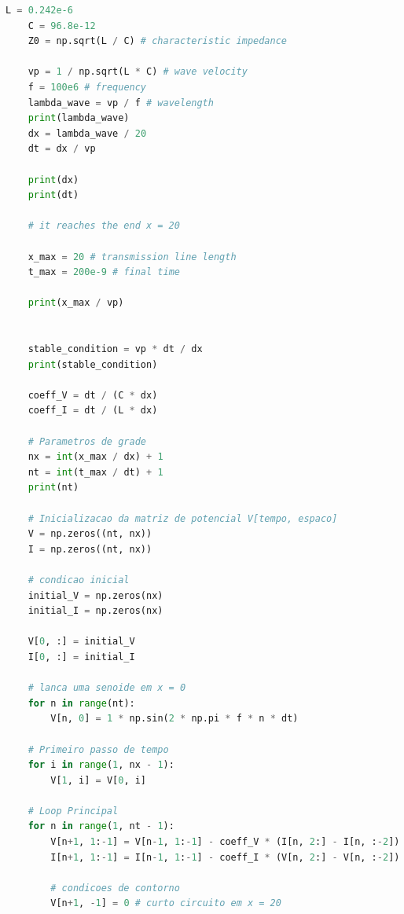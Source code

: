 \begin{anexosenv}
\begin{lstlisting}[language=Python, breaklines=true, basicstyle=\tiny]
    L = 0.242e-6
    C = 96.8e-12
    Z0 = np.sqrt(L / C) # characteristic impedance

    vp = 1 / np.sqrt(L * C) # wave velocity
    f = 100e6 # frequency
    lambda_wave = vp / f # wavelength
    print(lambda_wave)
    dx = lambda_wave / 20
    dt = dx / vp

    print(dx)
    print(dt)

    # it reaches the end x = 20 

    x_max = 20 # transmission line length
    t_max = 200e-9 # final time

    print(x_max / vp)


    stable_condition = vp * dt / dx
    print(stable_condition)

    coeff_V = dt / (C * dx)
    coeff_I = dt / (L * dx)

    # Parametros de grade
    nx = int(x_max / dx) + 1
    nt = int(t_max / dt) + 1
    print(nt)

    # Inicializacao da matriz de potencial V[tempo, espaco]
    V = np.zeros((nt, nx))
    I = np.zeros((nt, nx))

    # condicao inicial
    initial_V = np.zeros(nx)
    initial_I = np.zeros(nx)

    V[0, :] = initial_V
    I[0, :] = initial_I

    # lanca uma senoide em x = 0
    for n in range(nt):
        V[n, 0] = 1 * np.sin(2 * np.pi * f * n * dt)

    # Primeiro passo de tempo
    for i in range(1, nx - 1):
        V[1, i] = V[0, i]

    # Loop Principal
    for n in range(1, nt - 1):
        V[n+1, 1:-1] = V[n-1, 1:-1] - coeff_V * (I[n, 2:] - I[n, :-2])
        I[n+1, 1:-1] = I[n-1, 1:-1] - coeff_I * (V[n, 2:] - V[n, :-2])

        # condicoes de contorno
        V[n+1, -1] = 0 # curto circuito em x = 20



    \end{lstlisting}
    
\end{anexosenv}
